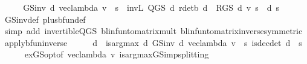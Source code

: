 \begin{isabellebody}
%
\isadelimproof
%
\endisadelimproof
%
\isatagproof
{}\isamarkupfalse%
\ {\isacharminus}{\kern0pt}\isanewline
\ \ \isamarkupfalse%
\ {\isachardoublequoteopen}GS{\isacharunderscore}{\kern0pt}inv\ d\ {\isacharparenleft}{\kern0pt}vec{\isacharunderscore}{\kern0pt}lambda\ v{\isacharparenright}{\kern0pt}\ {\isachardollar}{\kern0pt}\ s\ {\isacharequal}{\kern0pt}\ inv\isactrlsub L\ {\isacharparenleft}{\kern0pt}Q{\isacharunderscore}{\kern0pt}GS\ d{\isacharparenright}{\kern0pt}\ {\isacharparenleft}{\kern0pt}r{\isacharunderscore}{\kern0pt}det\isactrlsub b\ d\ {\isacharplus}{\kern0pt}\ R{\isacharunderscore}{\kern0pt}GS\ d\ v{\isacharparenright}{\kern0pt}\ s{\isachardoublequoteclose}\ \ d\ s\isanewline
\ \ \ \ \isamarkupfalse%
\ GS{\isacharunderscore}{\kern0pt}inv{\isacharunderscore}{\kern0pt}def\ plus{\isacharunderscore}{\kern0pt}bfun{\isacharunderscore}{\kern0pt}def\isanewline
\ \ \ \ \isamarkupfalse%
\ {\isacharparenleft}{\kern0pt}simp\ add{\isacharcolon}{\kern0pt}\ invertible{\isacharunderscore}{\kern0pt}Q{\isacharunderscore}{\kern0pt}GS\ blinfun{\isacharunderscore}{\kern0pt}to{\isacharunderscore}{\kern0pt}matrix{\isacharunderscore}{\kern0pt}mult{\isacharprime}{\kern0pt}\ blinfun{\isacharunderscore}{\kern0pt}to{\isacharunderscore}{\kern0pt}matrix{\isacharunderscore}{\kern0pt}inverse{\isacharparenleft}{\kern0pt}{}{\isacharparenright}{\kern0pt}{\isacharbrackleft}{\kern0pt}symmetric{\isacharbrackright}{\kern0pt}\ apply{\isacharunderscore}{\kern0pt}bfun{\isacharunderscore}{\kern0pt}inverse{\isacharparenright}{\kern0pt}\isanewline
\ \ \isamarkupfalse%
\ \isamarkupfalse%
\ d\ \ {\isachardoublequoteopen}is{\isacharunderscore}{\kern0pt}arg{\isacharunderscore}{\kern0pt}max\ {\isacharparenleft}{\kern0pt}{\isasymlambda}d{\isachardot}{\kern0pt}\ GS{\isacharunderscore}{\kern0pt}inv\ d\ {\isacharparenleft}{\kern0pt}vec{\isacharunderscore}{\kern0pt}lambda\ v{\isacharparenright}{\kern0pt}\ {\isachardollar}{\kern0pt}\ s{\isacharparenright}{\kern0pt}\ is{\isacharunderscore}{\kern0pt}dec{\isacharunderscore}{\kern0pt}det\ d{\isachardoublequoteclose}\ \ s\isanewline
\ \ \ \ \isamarkupfalse%
\ ex{\isacharunderscore}{\kern0pt}GS{\isacharunderscore}{\kern0pt}opt{\isacharbrackleft}{\kern0pt}of\ {\isachardoublequoteopen}vec{\isacharunderscore}{\kern0pt}lambda\ v{\isachardoublequoteclose}{\isacharbrackright}{\kern0pt}\ is{\isacharunderscore}{\kern0pt}arg{\isacharunderscore}{\kern0pt}max{\isacharunderscore}{\kern0pt}GS{\isacharunderscore}{\kern0pt}imp{\isacharunderscore}{\kern0pt}splitting\isanewline

\end{isabellebody}
